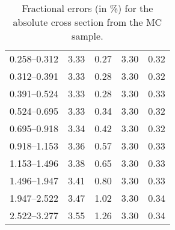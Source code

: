 \begin{table}
\begin{center}
\begin{tabular}{@{}l l l l l@{}}
            0.258--0.312 & 3.33 & 0.27 & 3.30 & 0.32  \\
            0.312--0.391 & 3.33 & 0.28 & 3.30 & 0.32  \\
            0.391--0.524 & 3.33 & 0.28 & 3.30 & 0.33  \\
            0.524--0.695 & 3.33 & 0.34 & 3.30 & 0.32  \\
            0.695--0.918 & 3.34 & 0.42 & 3.30 & 0.32  \\
            0.918--1.153 & 3.36 & 0.57 & 3.30 & 0.33  \\
            1.153--1.496 & 3.38 & 0.65 & 3.30 & 0.33  \\
            1.496--1.947 & 3.41 & 0.80 & 3.30 & 0.33  \\
            1.947--2.522 & 3.47 & 1.02 & 3.30 & 0.34  \\
            2.522--3.277 & 3.55 & 1.26 & 3.30 & 0.34  \\
            \bottomrule
        \end{tabular}
    \end{center}
    \caption{
        Fractional errors (in \%) for the absolute cross section from the
        \MADGRAPH MC sample.
    }
    \label{tab:madgraph_uncert_abs}
\end{table}
